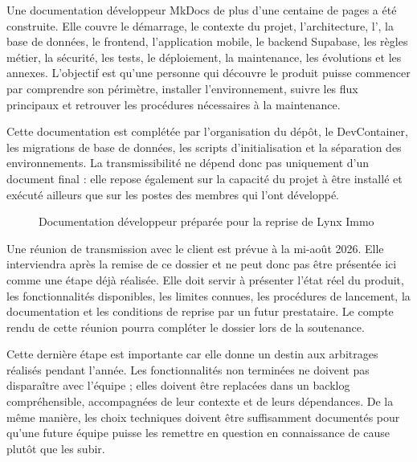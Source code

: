 Une documentation développeur MkDocs de plus d'une centaine de pages a été construite. Elle couvre le démarrage, le contexte du projet, l'architecture, l', la base de données, le frontend, l'application mobile, le backend Supabase, les règles métier, la sécurité, les tests, le déploiement, la maintenance, les évolutions et les annexes. L'objectif est qu'une personne qui découvre le produit puisse commencer par comprendre son périmètre, installer l'environnement, suivre les flux principaux et retrouver les procédures nécessaires à la maintenance.

Cette documentation est complétée par l'organisation du dépôt, le DevContainer, les migrations de base de données, les scripts d'initialisation et la séparation des environnements. La transmissibilité ne dépend donc pas uniquement d'un document final : elle repose également sur la capacité du projet à être installé et exécuté ailleurs que sur les postes des membres qui l'ont développé.

\begin{figure}[H]
\centering
{}
\caption{Documentation développeur préparée pour la reprise de Lynx Immo}
\label{fig:lynx-mkdocs}
\end{figure}

Une réunion de transmission avec le client est prévue à la mi-août 2026. Elle interviendra après la remise de ce dossier et ne peut donc pas être présentée ici comme une étape déjà réalisée. Elle doit servir à présenter l'état réel du produit, les fonctionnalités disponibles, les limites connues, les procédures de lancement, la documentation et les conditions de reprise par un futur prestataire. Le compte rendu de cette réunion pourra compléter le dossier lors de la soutenance.

Cette dernière étape est importante car elle donne un destin aux arbitrages réalisés pendant l'année. Les fonctionnalités non terminées ne doivent pas disparaître avec l'équipe ; elles doivent être replacées dans un backlog compréhensible, accompagnées de leur contexte et de leurs dépendances. De la même manière, les choix techniques doivent être suffisamment documentés pour qu'une future équipe puisse les remettre en question en connaissance de cause plutôt que les subir.

